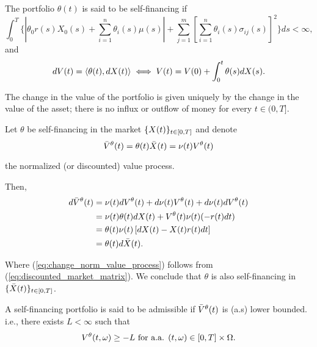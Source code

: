 \documentclass[../TGMAFFIRO.tex]{subfiles}
\begin{document}
\begin{definition}\label{def:self-financing-portfolio}
	The portfolio $\theta(t)$ is said to be self-financing if
	\begin{equation}
	\int_0^T\{|\theta_0r(s)X_0(s) + \sum_{i=1}^{n}\theta_i(s)\mu(s)| + \sum_{j=1}^m\left[\sum_{i=1}^n\theta_i(s)\sigma_{ij}(s)\right]^2\} ds < \infty,
	\end{equation}
and 
\begin{equation}
  dV(t) = \langle \theta(t), dX(t)\rangle \iff V(t) = V(0)  + \int_0^t \theta(s) dX(s).
\end{equation}

The change in the value of the portfolio is given uniquely by the change in the value of the asset; there is no influx or outflow of money for every $t\in(0,T]$.
\end{definition}

\begin{remark}
	Let $\theta$ be self-financing in the market $\{X(t)\}_{t\in[0,T]}$ and denote
	\begin{equation}
		\bar{V}^\theta(t) = \theta(t)\bar X(t) = \nu(t) V^\theta(t)
	\end{equation}
	
the normalized (or discounted) value process.

Then,
\begin{align}
	d\bar{V}^\theta(t	) &= \nu(t) dV^\theta(t) + d\nu(t) V^\theta(t) + d\nu(t) dV^\theta(t)\nonumber\\
	&= \nu(t)\theta(t)dX(t) + V^\theta(t)\nu(t)(-r(t)dt)\nonumber\\
	&= \theta(t)\nu(t)\left[dX(t) - X(t)r(t)dt\right]\nonumber\\
	&= \theta(t)d\bar{X}(t).\label{eq:change_norm_value_process}
\end{align}

Where (\ref{eq:change_norm_value_process}) follows from (\ref{eq:discounted_market_matrix}). We conclude that $\theta$ is also self-financing in $\{\bar{X}(t)\}_{t\in[0,T]}$.
\end{remark}


\begin{definition}
	A self-financing portfolio is said to be admissible if $\bar{V}^\theta(t)$ is (a.s) lower bounded. i.e., there exists $L < \infty$ such that
	\begin{equation}
		V^\theta(t, \omega)  \geq -L \ \text{for a.a. } (t,\omega) \in [0,T]\times \Omega.
	\end{equation}
\end{definition}
\end{document}
